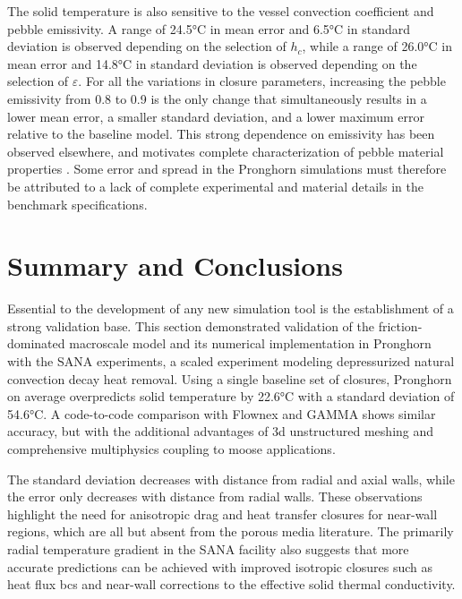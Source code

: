 The solid temperature is also sensitive to the vessel convection coefficient and pebble emissivity. A range of 24.5\si{\celsius} in mean error and 6.5\si{\celsius} in standard deviation is observed depending on the selection of \(h_c\), while a range of 26.0\si{\celsius} in mean error and 14.8\si{\celsius} in standard deviation is observed depending on the selection of \(\varepsilon\). For all the variations in closure parameters, increasing the pebble emissivity from 0.8 to 0.9 is the only change that simultaneously results in a lower mean error, a smaller standard deviation, and a lower maximum error relative to the baseline model. This strong dependence on emissivity has been observed elsewhere, and motivates complete characterization of pebble material properties \cite{tecdoc1163}. Some error and spread in the Pronghorn simulations must therefore be attributed to a lack of complete experimental and material details in the benchmark specifications.

\section{Summary and Conclusions}
\label{sec:5_summary}

Essential to the development of any new simulation tool is the establishment of a strong validation base. This section demonstrated validation of the friction-dominated macroscale model and its numerical implementation in Pronghorn with the SANA experiments, a scaled experiment modeling depressurized natural convection decay heat removal. Using a single baseline set of closures, Pronghorn on average overpredicts solid temperature by 22.6\si{\celsius} with a standard deviation of 54.6\si{\celsius}. A code-to-code comparison with Flownex and GAMMA shows similar accuracy, but with the additional advantages of \gls{3d} unstructured meshing and comprehensive multiphysics coupling to \gls{moose} applications. 

The standard deviation decreases with distance from radial and axial walls, while the error only decreases with distance from radial walls. These observations highlight the need for anisotropic drag and heat transfer closures for near-wall regions, which are all but absent from the porous media literature. The primarily radial temperature gradient in the SANA facility also suggests that more accurate predictions can be achieved with improved isotropic closures such as heat flux \glspl{bc} and near-wall corrections to the effective solid thermal conductivity. 

